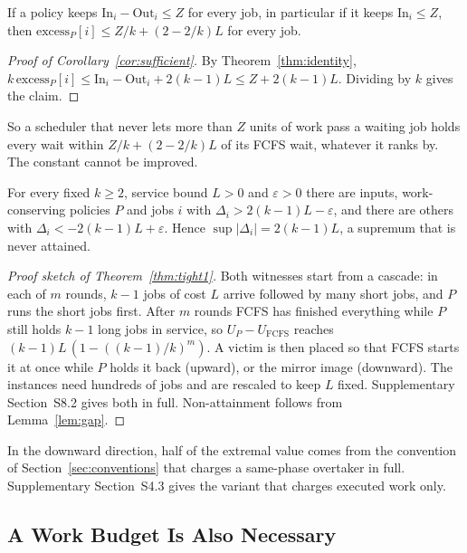 \begin{corollary}
\label{cor:sufficient}
If a policy keeps $\mathrm{In}_i - \mathrm{Out}_i \le Z$ for every job, in particular if it
keeps $\mathrm{In}_i \le Z$, then $\mathrm{excess}_P[i] \le Z/k + (2 - 2/k)L$ for every job.
\end{corollary}

\begin{proof}[Proof of Corollary~\ref{cor:sufficient}]
By Theorem~\ref{thm:identity}, $k\,\mathrm{excess}_P[i] \le \mathrm{In}_i - \mathrm{Out}_i +
2(k-1)L \le Z + 2(k-1)L$. Dividing by $k$ gives the claim.
\end{proof}

So a scheduler that never lets more than $Z$ units of work pass a waiting job holds every
wait within $Z/k + (2-2/k)L$ of its FCFS wait, whatever it ranks by. The constant cannot be
improved.

\begin{theorem}
\label{thm:tight1}
For every fixed $k \ge 2$, service bound $L>0$ and $\varepsilon > 0$ there are inputs,
work-conserving policies $P$ and jobs $i$ with $\Delta_i > 2(k-1)L - \varepsilon$, and there
are others with $\Delta_i < -2(k-1)L + \varepsilon$. Hence $\sup |\Delta_i| = 2(k-1)L$, a
supremum that is never attained.
\end{theorem}

\begin{proof}[Proof sketch of Theorem~\ref{thm:tight1}]
Both witnesses start from a cascade: in each of $m$ rounds, $k-1$ jobs of cost $L$ arrive
followed by many short jobs, and $P$ runs the short jobs first. After $m$ rounds FCFS has
finished everything while $P$ still holds $k-1$ long jobs in service, so
$U_P - U_{\mathrm{FCFS}}$ reaches $(k-1)L\,(1 - ((k-1)/k)^m)$. A victim is then placed so
that FCFS starts it at once while $P$ holds it back (upward), or the mirror image
(downward). The instances
need hundreds of jobs and are rescaled to keep $L$ fixed. Supplementary Section~S8.2 gives
both in full. Non-attainment follows from Lemma~\ref{lem:gap}.
\end{proof}

In the downward direction, half of the extremal value comes from the convention of
Section~\ref{sec:conventions} that charges a same-phase overtaker in full. Supplementary
Section~S4.3 gives the variant that charges executed work only.

\subsection{A Work Budget Is Also Necessary}
\label{sec:th_necessity}

